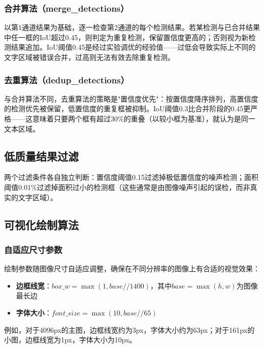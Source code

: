 \documentclass[12pt,hyperref,a4paper,UTF8]{ctexart}
\begin{document}
\subsubsection{合并算法（merge\_detections）}

以第1通道结果为基础，逐一检查第2通道的每个检测结果。若某检测与已合并结果中任一框的IoU超过0.45，则判定为重复检测，保留置信度更高的；否则视为新检测结果追加。IoU阈值0.45是经过实验调优的经验值——过低会导致实际上不同的文字区域被错误合并，过高则无法有效去除重复检测。

\subsubsection{去重算法（dedup\_detections）}

与合并算法不同，去重算法的策略是"置信度优先"：按置信度降序排列，高置信度的检测优先被保留，低置信度的重复框被抑制。IoU阈值0.3比合并阶段的0.45更严格——这意味着只要两个框有超过30\%的重叠（以较小框为基准），就认为是同一文本区域。

\subsection{低质量结果过滤}

两个过滤条件各自独立判断：置信度阈值0.15过滤掉极低置信度的噪声检测；面积阈值0.01\%过滤掉面积过小的检测框（这些通常是由图像噪声引起的误检，而非真实的文字区域）。

\subsection{可视化绘制算法}

\subsubsection{自适应尺寸参数}

绘制参数随图像尺寸自适应调整，确保在不同分辨率的图像上有合适的视觉效果：

\begin{itemize}
    \item \textbf{边框线宽}：$box\_w = \max(1, base // 1400)$，其中$base = \max(h, w)$为图像最长边
    \item \textbf{字体大小}：$font\_size = \max(10, base // 65)$
\end{itemize}

例如，对于4096px的主图，边框线宽约为3px，字体大小约为63px；对于161px的小图，边框线宽为1px，字体大小为10px。
\end{document}
